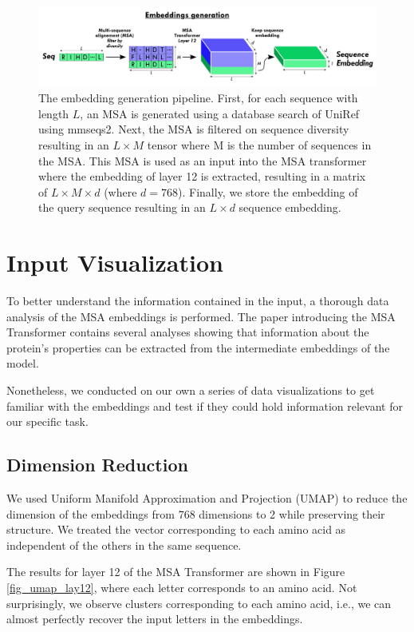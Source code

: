 \documentclass[11pt,a4paper]{article}
\begin{document}
\begin{figure}[t]
\centering
\includegraphics[width=\textwidth]{emb_gen.png}
\caption{The embedding generation pipeline. First, for each sequence with length $L$, an MSA is generated using a database search of UniRef using mmseqs2. Next, the MSA is filtered on sequence diversity resulting in an $L \times M$ tensor where M is the number of sequences in the MSA. This MSA is used as an input into the MSA transformer where the embedding of layer 12 is extracted, resulting in a matrix of $L \times M \times d$ (where $d = 768$). Finally, we store the embedding of the query sequence resulting in an $L \times d$ sequence embedding.}
\label{fig2}
\end{figure}



\section{Input Visualization}

To better understand the information contained in the input, a thorough data analysis of the MSA embeddings is performed. The paper introducing the MSA Transformer \cite{rao2021msa} contains several analyses showing that information about the protein's properties can be extracted from the intermediate embeddings of the model.

Nonetheless, we conducted on our own a series of data visualizations to get familiar with the embeddings and test if they could hold information relevant for our specific task.

\subsection{Dimension Reduction}

We used Uniform Manifold Approximation and Projection (UMAP) \cite{mcinnes2018umap} to reduce the dimension of the embeddings from 768 dimensions to 2 while preserving their structure. We treated the vector corresponding to each amino acid as independent of the others in the same sequence. 

The results for layer 12 of the MSA Transformer are shown in Figure \ref{fig_umap_lay12}, where each letter corresponds to an amino acid. Not surprisingly, we observe clusters corresponding to each amino acid, i.e., we can almost perfectly recover the input letters in the embeddings.
\end{document}
